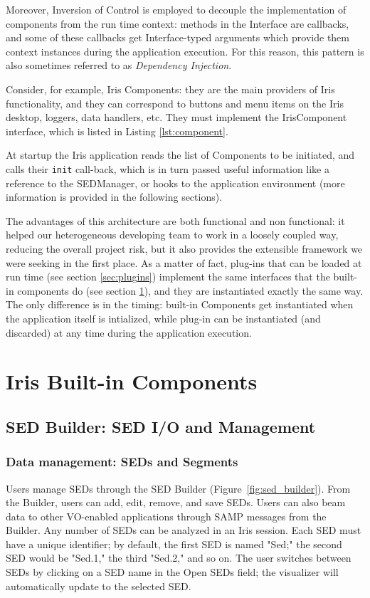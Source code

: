 \documentclass[preprint,12pt,3p]{elsarticle}
\begin{document}
Moreover, Inversion of Control is employed to decouple the implementation of components from the run time context: methods in the Interface are callbacks, and some of these callbacks get Interface-typed arguments which provide them context instances during the application execution. For this reason, this pattern is also sometimes referred to as \emph{Dependency Injection}.

Consider, for example, Iris Components: they are the main providers of Iris functionality, and they can correspond to buttons and menu items on the Iris desktop, loggers, data handlers, etc. They must implement the IrisComponent interface, which is listed in Listing \ref{lst:component}.

At startup the Iris application reads the list of Components to be initiated, and calls their \verb|init| call-back, which is in turn passed useful information like a reference to the SEDManager, or hooks to the application environment (more information is provided in the following sections).

The advantages of this architecture are both functional and non functional: it helped our heterogeneous developing team to work in a loosely coupled way, reducing the overall project risk, but it also provides the extensible framework we were seeking in the first place. As a matter of fact, plug-ins that can be loaded at run time (see section \ref{sec:plugins}) implement the same interfaces that the built-in components do (see section \ref{sec:components}), and they are instantiated exactly the same way. The only difference is in the timing: built-in Components get instantiated when the application itself is intialized, while plug-in can be instantiated (and discarded) at any time during the application execution.

\section{Iris Built-in Components}
\label{sec:components}

\subsection{SED Builder: SED I/O and Management}
\subsubsection{Data management: SEDs and Segments}
Users manage SEDs through the SED Builder (Figure~\ref{fig:sed_builder}). From the Builder, users can add, edit, remove, and save SEDs. Users can also beam data to other VO-enabled applications through SAMP messages from the Builder. Any number of SEDs can be analyzed in an Iris session. Each SED must have a unique identifier; by default, the first SED is named "Sed;" the second SED would be "Sed.1," the third "Sed.2," and so on. The user switches between SEDs by clicking on a SED name in the Open SEDs field; the visualizer will automatically update to the selected SED. 
\end{document}
